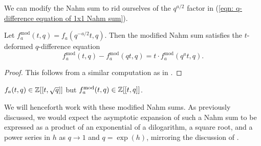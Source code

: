 We can modify the Nahm sum to rid ourselves of the $q^{a/2}$ factor in (\ref{eqn: q-difference equation of 1x1 Nahm sum}). 
\begin{corollary}\label{corr: q-difference equation of modified 1x1 Nahm sum}
    Let $f_{a}^{\mathrm{mod}}(t,q)=f_{a}(q^{-a/2}t,q)$. Then the modified Nahm sum satisfies the $t$-deformed $q$-difference equation 
    \begin{equation}\label{eqn: q-difference equation}
        f_{a}^{\mathrm{mod}}(t,q) - f_{a}^{\mathrm{mod}}(qt,q) = t\cdot f_{a}^{\mathrm{mod}}(q^{a}t,q).
    \end{equation}
\end{corollary}
\begin{proof}
    This follows from a similar computation as in . 
\end{proof}
\begin{remark}
    $f_{a}(t,q)\in\mathbb{Z}[[t,\sqrt{q}]]$ but $f_{a}^{\mathrm{mod}}(t,q)\in\mathbb{Z}[[t,q]]$. 
\end{remark}
We will henceforth work with these modified Nahm sums. As previously discussed, we would expect the asymptotic expansion of such a Nahm sum to be expressed as a product of an exponential of a dilogarithm, a square root, and a power series in $h$ as $q\to 1$ and $q=\exp(h)$, mirroring the discussion of . 

